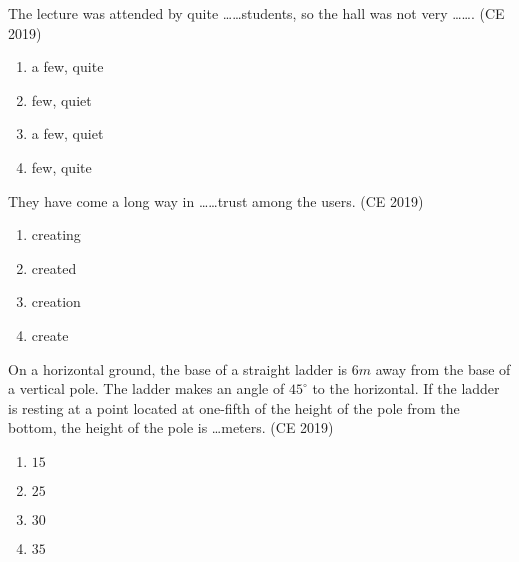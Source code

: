 \iffalse
\chapter{2019}
\author{AI24BTECH11030}
\section{ce}
\fi
    
    \item The lecture was attended by quite \ldots\ldots students, so the hall was not very \ldots\ldots. \hfill (CE 2019)
    \begin{multicols}{4}
        \begin{enumerate}
            \item a few, quite
            \item few, quiet
            \item a few, quiet
            \item few, quite
        \end{enumerate}
    \end{multicols}

    \item They have come a long way in \ldots\ldots trust among the users.  \hfill (CE 2019)
    \begin{multicols}{4}
        \begin{enumerate}
            \item creating
            \item created
            \item creation
            \item create
        \end{enumerate}
    \end{multicols}

    \item On a horizontal ground, the base of a straight ladder is $6 m$ away from the base of a vertical pole. The ladder makes an angle of $45^\circ$ to the horizontal. If the ladder is resting at a point located at one-fifth of the height of the pole from the bottom, the height of the pole is \ldots meters.  \hfill (CE 2019)
    \begin{multicols}{4}
        \begin{enumerate}
            \item $15$
            \item $25$
            \item $30$
            \item $35$
        \end{enumerate}
    \end{multicols}


